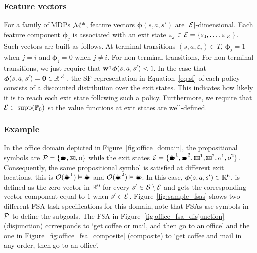  \subsubsection{Feature vectors} For a family of MDPs $\mathcal{M}^{\boldsymbol{\phi}}$, feature vectors $\boldsymbol\phi(s, a, s')$ are \mbox{$\lvert\mathcal{E}\rvert$-dimensional}. Each feature component $\boldsymbol\phi_j$ is associated with an exit state $\varepsilon_j\in\mathcal{E}=\{\varepsilon_1,\ldots,\varepsilon_{\lvert\mathcal{E}\rvert}\}$. Such vectors are built as follows. At terminal transitions $(s, a, \varepsilon_i)\in T$, $\boldsymbol\phi_{j} = 1$ when $j=i$ and $\boldsymbol\phi_{j}=0$ when $j\neq i$. For non-terminal transitions,  For non-terminal transitions, we just require that $\mathbf{w}^\intercal\boldsymbol\phi(s, a, s')<1$. In the case that ${\boldsymbol\phi(s, a, s')=\textbf{0}\in\mathbb{R}^{\lvert\mathcal{E}\rvert}}$, the SF representation in Equation~\eqref{eq:sf} of each policy consists of a discounted distribution over the exit states. This indicates how likely it is to reach each exit state following such a policy. Furthermore, we require that $\mathcal{E}\subset\text{supp}(\mathbb{P}_0)$ so the value functions at exit states are well-defined.

 \subsubsection{Example} In the office domain depicted in Figure~\ref{fig:office_domain}, the propositional symbols are $\cP=\{\text{\coffee}, \text{\mail}, \text{o}\}$ while the exit states $\cE=\{\text{\coffee}^1, \text{\coffee}^2,\text{\mail}^1,\text{\mail}^2,o^1,o^2\}$. Consequently, the same propositional symbol is satisfied at different exit locations, this is $\cO(\text{\coffee}^1)\vDash\text{\coffee}$ and $\cO(\text{\coffee}^2)\vDash\text{\coffee}$. In this case, $\boldsymbol\phi(s, a, s')\in\mathbb{R}^6$, is defined as the zero vector in $\mathbb{R}^6$ for every $s'\in\mathcal{S}\setminus\mathcal{E}$ and gets the corresponding vector component equal to $1$ when $s'\in\mathcal{E}$. Figure~\ref{fig:sample_fsas} shows two different FSA task specifications for this domain, note that FSAs use symbols in $\mathcal{P}$ to define the subgoals. The FSA in Figure~\ref{fig:office_fsa_disjunction} (disjunction) corresponds to `get coffee or mail, and then go to an office' and the one in Figure~\ref{fig:office_fsa_composite} (composite) to `get coffee and mail in any order, then go to an office'. 


